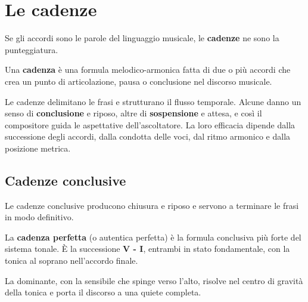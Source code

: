 \chapter{Le cadenze}
\label{chap:cadenze}

Se gli accordi sono le parole del linguaggio musicale, le \textbf{cadenze} ne sono la punteggiatura.

\begin{definizione}[La cadenza]
	\label{def:cadenza}
	Una \textbf{cadenza} è una formula melodico-armonica fatta di due o più accordi che crea un punto di articolazione, pausa o conclusione nel discorso musicale.
\end{definizione}

Le cadenze delimitano le frasi e strutturano il flusso temporale. Alcune danno un senso di \textbf{conclusione} e riposo, altre di \textbf{sospensione} e attesa, e così il compositore guida le aspettative dell'ascoltatore. La loro efficacia dipende dalla successione degli accordi, dalla condotta delle voci, dal ritmo armonico e dalla posizione metrica.

\section{Cadenze conclusive}
\label{sec:cadenze_conclusive}

Le cadenze conclusive producono chiusura e riposo e servono a terminare le frasi in modo definitivo.

\begin{definizione}
	\label{def:cadenza_perfetta}
	La \textbf{cadenza perfetta} (o autentica perfetta) è la formula conclusiva più forte del sistema tonale. È la successione \textbf{V - I}, entrambi in stato fondamentale, con la tonica al soprano nell'accordo finale.
\end{definizione}

La dominante, con la sensibile che spinge verso l'alto, risolve nel centro di gravità della tonica e porta il discorso a una quiete completa.

\begin{esempio}
	\label{ex:cadenza_perfetta}
\end{esempio}

